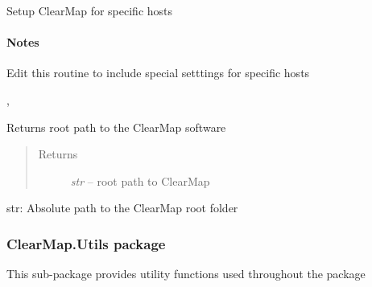 \documentclass[letterpaper,10pt,english]{sphinxmanual}
\begin{document}

\begin{fulllineitems}
\label{api/ClearMap.Settings:ClearMap.Settings.setup}
Setup ClearMap for specific hosts
\paragraph{Notes}

Edit this routine to include special setttings for specific hosts




{\hyperref[api/ClearMap.Settings:ClearMap.Settings.IlastikPath]{\emph{}}}, {\hyperref[api/ClearMap.Settings:ClearMap.Settings.ElastixPath]{\emph{}}}



\end{fulllineitems}


\begin{fulllineitems}
\label{api/ClearMap.Settings:ClearMap.Settings.clearMapPath}
Returns root path to the ClearMap software
\begin{quote}\begin{description}
\item[{Returns}] \leavevmode
\emph{str} --
root path to ClearMap

\end{description}\end{quote}

\end{fulllineitems}


\begin{fulllineitems}
\label{api/ClearMap.Settings:ClearMap.Settings.ClearMapPath}
str: Absolute path to the ClearMap root folder

\end{fulllineitems}



\subsubsection{ClearMap.Utils package}
\label{api/ClearMap.Utils:module-ClearMap.Utils}\label{api/ClearMap.Utils::doc}\label{api/ClearMap.Utils:clearmap-utils-package}
This sub-package provides utility functions used throughout the package
\end{document}

